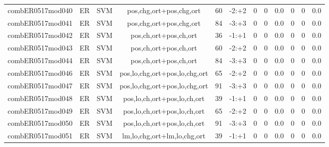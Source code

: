 \documentclass[a4paper]{article}
\begin{document}
\begin{landscape}
\begin{center}
\begin{tabular}{ |c|c|c|c|c|c|c|c|c|c|c|c|}
 
 	
 	\small{ combER0517mod040 } & ER & SVM & pos,chg,ort+pos,chg,ort  &  60 &  -2:+2  &  0 & 0 & 0.0  &  0 & 0 & 0.0 \\
 	

 
 	
 	\small{ combER0517mod041 } & ER & SVM & pos,chg,ort+pos,chg,ort  &  84 &  -3:+3  &  0 & 0 & 0.0  &  0 & 0 & 0.0 \\
 	

 
 	
 	\small{ combER0517mod042 } & ER & SVM & pos,ch,ort+pos,ch,ort  &  36 &  -1:+1  &  0 & 0 & 0.0  &  0 & 0 & 0.0 \\
 	

 
 	
 	\small{ combER0517mod043 } & ER & SVM & pos,ch,ort+pos,ch,ort  &  60 &  -2:+2  &  0 & 0 & 0.0  &  0 & 0 & 0.0 \\
 	

 
 	
 	\small{ combER0517mod044 } & ER & SVM & pos,ch,ort+pos,ch,ort  &  84 &  -3:+3  &  0 & 0 & 0.0  &  0 & 0 & 0.0 \\
 	

 
 	
 	\small{ combER0517mod046 } & ER & SVM & pos,lo,chg,ort+pos,lo,chg,ort  &  65 &  -2:+2  &  0 & 0 & 0.0  &  0 & 0 & 0.0 \\
 	

 
 	
 	\small{ combER0517mod047 } & ER & SVM & pos,lo,chg,ort+pos,lo,chg,ort  &  91 &  -3:+3  &  0 & 0 & 0.0  &  0 & 0 & 0.0 \\
 	

 
 	
 	\small{ combER0517mod048 } & ER & SVM & pos,lo,ch,ort+pos,lo,ch,ort  &  39 &  -1:+1  &  0 & 0 & 0.0  &  0 & 0 & 0.0 \\
 	

 
 	
 	\small{ combER0517mod049 } & ER & SVM & pos,lo,ch,ort+pos,lo,ch,ort  &  65 &  -2:+2  &  0 & 0 & 0.0  &  0 & 0 & 0.0 \\
 	

 
 	
 	\small{ combER0517mod050 } & ER & SVM & pos,lo,ch,ort+pos,lo,ch,ort  &  91 &  -3:+3  &  0 & 0 & 0.0  &  0 & 0 & 0.0 \\
 	

 
 	
 	\small{ combER0517mod051 } & ER & SVM & lm,lo,chg,ort+lm,lo,chg,ort  &  39 &  -1:+1  &  0 & 0 & 0.0  &  0 & 0 & 0.0 \\
 	


\end{tabular}
\end{center}
\end{landscape}
\end{document}
